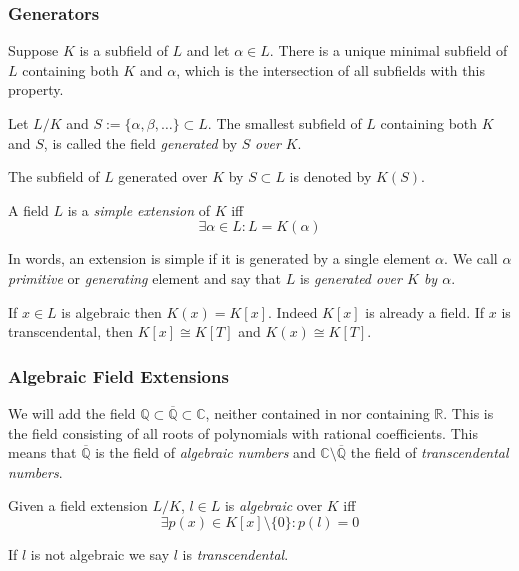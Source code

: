 \subsubsection{Generators}
Suppose \(K\) is a subfield of \(L\) and let \(\alpha \in L\).
There is a unique minimal subfield of \(L\) containing both \(K\) and \(\alpha\), which is the intersection of all subfields with this property.

\begin{definition}
   Let \(L/K\) and \(S := \{\alpha, \beta, \ldots\} \subset L\).
   The smallest subfield of \(L\) containing both \(K\) and \(S\), is called the field \emph{generated} by \(S\) \emph{over} \(K\).
\end{definition}
\begin{remark}[Notation]
   The subfield of \(L\) generated over \(K\) by \(S \subset L\) is denoted by \(K(S)\).
\end{remark}

\begin{definition}
   A field \(L\) is a \emph{simple extension} of \(K\) iff
   \[\exists \alpha \in L: L = K(\alpha)\]
\end{definition}
\begin{remark}[Terminology]
   In words, an extension is simple if it is generated by a single element \(\alpha\).
   We call \(\alpha\) \emph{primitive} or \emph{generating} element and say that \(L\) is \emph{generated over \(K\) by \(\alpha\)}.
\end{remark}
If \(x \in L\) is algebraic then \(K(x) = K[x]\).
Indeed \(K[x]\) is already a field.
If \(x\) is transcendental, then \(K[x] \cong K[T]\) and \(K(x) \cong K[T]\).

\subsubsection{Algebraic Field Extensions}
We will add the field \(\mathbb{Q} \subset \overline{\mathbb{Q}} \subset \mathbb{C}\), neither contained in nor containing \(\mathbb{R}\).
This is the field consisting of all roots of polynomials with rational coefficients.
This means that \(\overline{\mathbb{Q}}\) is the field of \emph{algebraic numbers} and \(\mathbb{C} \setminus \overline{\mathbb{Q}}\) the field of \emph{transcendental numbers}.

\begin{definition}
   Given a field extension \(L/K\), \(l \in L\) is \emph{algebraic} over \(K\) iff
   \[\exists p(x) \in K[x] \setminus \{0\}: p(l) = 0\]
\end{definition}
\begin{remark}[Terminology]
   If \(l\) is not algebraic we say \(l\) is \emph{transcendental}.
\end{remark}

